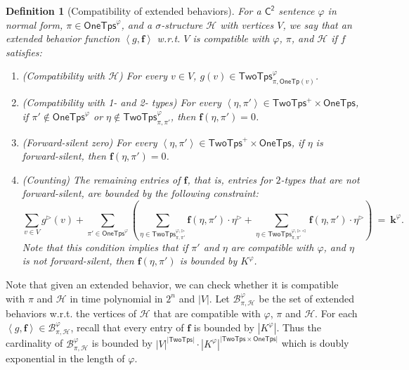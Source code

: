 \documentclass[10pt,a4paper]{article}
\newtheorem{definition}[theorem]{Definition}
\theoremstyle{definition}
\theoremstyle{remark}
\newcommand{\cB}{\mathcal{B}}
\newcommand{\cH}{\mathcal{H}}
\newcommand{\cK}{\mathsf{TwoTps}}
\newcommand{\bff}{\mathbf{f}}
\newcommand{\bfk}{\mathbf{k}}
\newcommand{\vocab}{\sigma}
\newcommand{\Ctwo}    {\mathsf{C^2}}
\newcommand{\onetypeof}{\mathsf{OneTp}}
\newcommand{\twotypes}{\mathsf{TwoTps}}
\newcommand{\onetypes}{\mathsf{OneTps}}
\newcommand{\Onetypes}{\mathsf{OneTps}}
\newcommand{\tuple}[1]       {\left\langle #1 \right\rangle}
\newcommand{\abs}[1]         {{\left| #1 \right|}}
\newcommand{\trif} {\triangleright}
\newcommand{\trib} {\triangleleft}
\newcommand{\cKvpf}     {\cK^{\varphi, \trif}}
\newcommand{\cKvpfb}    {\cK^{\varphi, \trif\trib}}
\begin{document}
\begin{definition}[Compatibility of extended behaviors]\label{def:compatextended}
    For a $\Ctwo$ sentence $\varphi$ in normal form,
    $\pi \in \onetypes^\varphi$, and
    a $\vocab$-structure $\cH$ with vertices $V$,
    we say that an extended behavior function $\tuple{g, \bff}$ w.r.t. $V$ is
    \emph{compatible} with $\varphi$, $\pi$, and $\cH$
    if $f$ satisfies:
    \begin{enumerate}
        \item (Compatibility with $\cH$)
        For every $v \in V$, $g(v) \in \twotypes^\varphi_{\pi, \onetypeof(v)}$.

        \item (Compatibility with 1- and 2- types)
        For every $\tuple{\eta, \pi'} \in \twotypes^+ \times \Onetypes$,
        if $\pi' \not\in \onetypes^\varphi$ or 
        $\eta \not\in \twotypes^\varphi_{\pi, \pi'}$,
        then $\bff(\eta, \pi') = 0$.

        \item (Forward-silent zero)
        For every $\tuple{\eta, \pi'} \in \twotypes^+ \times \Onetypes$,
        if $\eta$ is forward-silent,
        then $\bff(\eta, \pi') = 0$.
       
        \item (Counting) The remaining entries of $\bff$,
        that is, entries for $2$-types that are not forward-silent, are bounded by the following constraint:
        \begin{equation*}
            \sum_{v \in V} g^\trif(v) + 
            \sum_{\pi' \in \Onetypes^\varphi}
            \left(
                \sum_{\eta \in \cKvpf_{\pi, \pi'}} \bff(\eta, \pi') \cdot \eta^\trif +
                \sum_{\eta \in \cKvpfb_{\pi, \pi'}} \bff(\eta, \pi') \cdot \eta^\trif
            \right)
            \ =\ \bfk^\varphi.
        \end{equation*}
        Note that this condition implies that
        if $\pi'$ and $\eta$ are compatible with $\varphi$, and
        $\eta$ is not forward-silent,
        then $\bff(\eta, \pi')$ is bounded by $K^\varphi$.
    \end{enumerate}
\end{definition}

Note that given an extended behavior,
we can check whether it is compatible with $\pi$ and $\cH$ in time polynomial in $2^n$ and $\abs{V}$.
Let $\cB^{\varphi}_{\pi, \cH}$ be the set of extended behaviors w.r.t. 
the vertices of $\cH$ that are compatible with $\varphi$, $\pi$ and $\cH$.
For each $\tuple{g, \bff} \in \cB^{\varphi}_{\pi, \cH}$,
recall that every entry of $\bff$ is bounded by $\abs{K^\varphi}$.
Thus the cardinality of $\cB^{\varphi}_{\pi, \cH}$ is bounded by
$\abs{V}^\abs{\cK} \cdot \abs{K^\varphi}^\abs{\twotypes \times \onetypes}$
which is doubly exponential in the length of $\varphi$.
\end{document}
